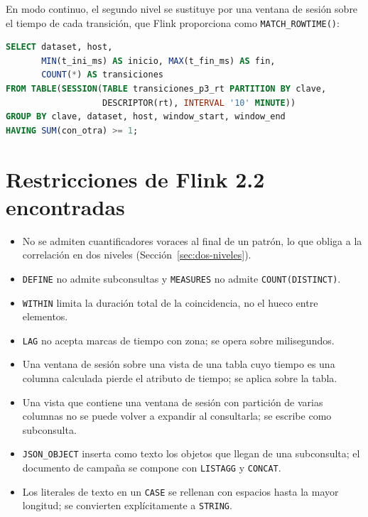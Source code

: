 En modo continuo, el segundo nivel se sustituye por una ventana de sesión sobre el tiempo de
cada transición, que Flink proporciona como \texttt{MATCH\_ROWTIME()}:

\begin{lstlisting}[language=SQL,caption={P3: segundo nivel en modo continuo.},label={lst:p3-sesion}]
SELECT dataset, host,
       MIN(t_ini_ms) AS inicio, MAX(t_fin_ms) AS fin,
       COUNT(*) AS transiciones
FROM TABLE(SESSION(TABLE transiciones_p3_rt PARTITION BY clave,
                   DESCRIPTOR(rt), INTERVAL '10' MINUTE))
GROUP BY clave, dataset, host, window_start, window_end
HAVING SUM(con_otra) >= 1;
\end{lstlisting}

\section{Restricciones de Flink 2.2 encontradas}

\begin{itemize}
    \item No se admiten cuantificadores voraces al final de un patrón, lo que obliga a la
    correlación en dos niveles (Sección~\ref{sec:dos-niveles}).
    \item \texttt{DEFINE} no admite subconsultas y \texttt{MEASURES} no admite
    \texttt{COUNT(DISTINCT)}.
    \item \texttt{WITHIN} limita la duración total de la coincidencia, no el hueco entre
    elementos.
    \item \texttt{LAG} no acepta marcas de tiempo con zona; se opera sobre milisegundos.
    \item Una ventana de sesión sobre una vista de una tabla cuyo tiempo es una columna
    calculada pierde el atributo de tiempo; se aplica sobre la tabla.
    \item Una vista que contiene una ventana de sesión con partición de varias columnas no se
    puede volver a expandir al consultarla; se escribe como subconsulta.
    \item \texttt{JSON\_OBJECT} inserta como texto los objetos que llegan de una subconsulta;
    el documento de campaña se compone con \texttt{LISTAGG} y \texttt{CONCAT}.
    \item Los literales de texto en un \texttt{CASE} se rellenan con espacios hasta la mayor
    longitud; se convierten explícitamente a \texttt{STRING}.
\end{itemize}
